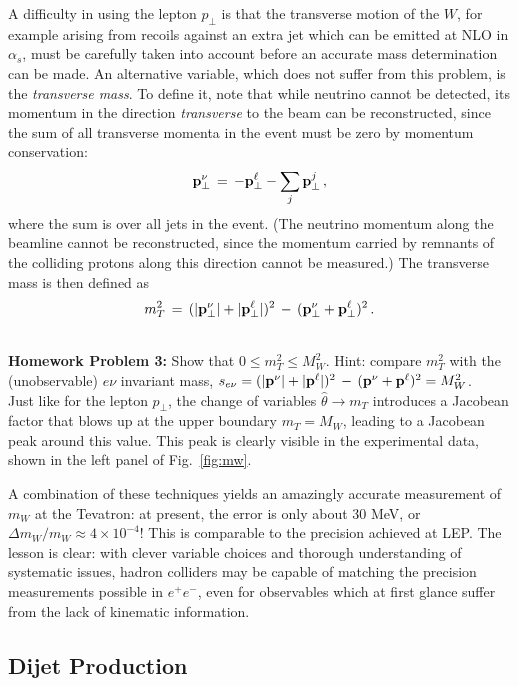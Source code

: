 \documentclass{ws-procs9x6}
\def\beq{\begin{equation}}
\def\eeq#1{\label{#1}\end{equation}}
\begin{document}
A difficulty in using the lepton $p_\perp$ is that the transverse motion of the $W$, for example arising from recoils against an extra jet which can be emitted at NLO in $\alpha_s$, must be carefully taken into account before an accurate mass determination can be made. An alternative variable, which does not suffer from this problem, is the {\it transverse mass}. To define it, note that while neutrino cannot be detected, its momentum in the direction {\it transverse} to the beam can be reconstructed, since the sum of all transverse momenta in the event must be zero by momentum conservation:
\beq
{\bf p}_\perp^\nu \,=\, - {\bf p}_\perp^\ell - \sum_j {\bf p}_\perp^j\,,
\eeq{nu_pT}
where the sum is over all jets in the event. (The neutrino momentum along the beamline cannot be reconstructed, since the momentum carried by remnants of the colliding protons along this direction cannot be measured.) The transverse mass is then defined as
\beq
m_T^2 \,=\, (|{\bf p}_\perp^\nu|+|{\bf p}_\perp^\ell|)^2\,-\,({\bf p}_\perp^\nu+{\bf p}_\perp^\ell)^2\,.
\eeq{mT_def} 

~\\
{\bf Homework Problem 3:} Show that $0\leq m_T^2\leq M_W^2$. Hint: compare $m_T^2$ with the (unobservable) $e\nu$ invariant mass, $s_{e\nu}=(|{\bf p}^\nu|+|{\bf p}^\ell|)^2\,-\,({\bf p}^\nu+{\bf p}^\ell)^2 = M_W^2$.
~\\

Just like for the lepton $p_\perp$, the change of variables $\hat{\theta}\to m_T$ introduces a Jacobean factor that blows up at the upper boundary $m_T=M_W$, leading to a Jacobean peak around this value. This peak is clearly visible in the experimental data, shown in the left panel of Fig.~\ref{fig:mw}.

A combination of these techniques yields an amazingly accurate measurement of $m_W$ at the Tevatron: at present, the error is only about 30 MeV, or $\Delta m_W/m_W\approx  4\times 10^{-4}$! This is comparable to the precision achieved at LEP. The lesson is clear: with clever variable choices and thorough understanding of systematic issues, hadron colliders may be capable of matching the precision measurements possible in $e^+e^-$, even for observables which at first glance suffer from the lack of kinematic information. 

\subsection{Dijet Production}
\label{sec:ppjet}
\end{document}
